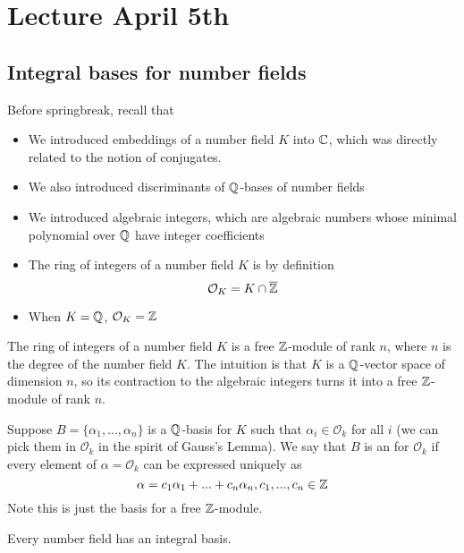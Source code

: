 \section{Lecture April 5th}

\subsection{Integral bases for number fields}

Before springbreak, recall that
\begin{itemize}
    \item We introduced embeddings of a number field $K$ into $\mathbb{C}$, which was directly related to the notion of conjugates.
    \item We also introduced discriminants of $\mathbb{Q}$-bases of number fields
    \item We introduced algebraic integers, which are algebraic numbers whose minimal polynomial over $\mathbb{Q}$ have integer coefficients
    \item The ring of integers of a number field $K$ is by definition
    \[\mathcal{O}_K = K \cap \overline{\mathbb{Z}}\]
    \item When $K = \mathbb{Q}$, $\mathcal{O}_K = \mathbb{Z}$
\end{itemize}

\begin{remark}
The ring of integers of a number field $K$ is a free $\mathbb{Z}$-module of rank $n$, where $n$ is the degree of the number field $K$. The intuition is that $K$ is a $\mathbb{Q}$-vector space of dimension $n$, so its contraction to the algebraic integers turns it into a free $\mathbb{Z}$-module of rank $n$.
\end{remark}

\begin{definition}
Suppose $B = \{\alpha_1, ..., \alpha_n\}$ is a $\mathbb{Q}$-basis for $K$ such that $\alpha_i \in \mathcal{O}_k$ for all $i$ (we can pick them in $\mathcal{O}_k$ in the spirit of Gauss's Lemma). We say that $B$ is an  for $\mathcal{O}_k$ if every element of $\alpha = \mathcal{O}_k$ can be expressed uniquely as
\[\alpha = c_1 \alpha_1 + ... + c_n \alpha_n, c_1, ..., c_n \in \mathbb{Z}\]
Note this is just the basis for a free $\mathbb{Z}$-module.
\end{definition}

\begin{theorem}
Every number field has an integral basis.
\end{theorem}

